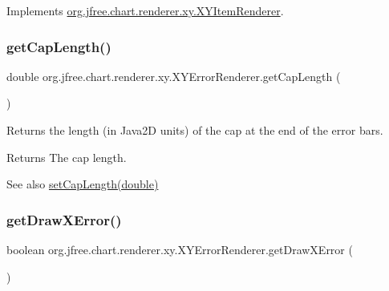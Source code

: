 Implements \mbox{\hyperlink{interfaceorg_1_1jfree_1_1chart_1_1renderer_1_1xy_1_1_x_y_item_renderer_af9ac6f440e99c73d343de7851e89496a}{org.\+jfree.\+chart.\+renderer.\+xy.\+X\+Y\+Item\+Renderer}}.

\mbox{\label{classorg_1_1jfree_1_1chart_1_1renderer_1_1xy_1_1_x_y_error_renderer_ad72439c734df92e2dd89e4fa6dc5f071}} 
\subsubsection{\texorpdfstring{get\+Cap\+Length()}{getCapLength()}}
{\footnotesize\ttfamily double org.\+jfree.\+chart.\+renderer.\+xy.\+X\+Y\+Error\+Renderer.\+get\+Cap\+Length (\begin{DoxyParamCaption}{ }\end{DoxyParamCaption})}

Returns the length (in Java2D units) of the cap at the end of the error bars.

\begin{DoxyReturn}{Returns}
The cap length.
\end{DoxyReturn}
\begin{DoxySeeAlso}{See also}
\mbox{\hyperlink{classorg_1_1jfree_1_1chart_1_1renderer_1_1xy_1_1_x_y_error_renderer_a78522ec7f32d90e558624ff4dab196cb}{set\+Cap\+Length(double)}} 
\end{DoxySeeAlso}
\mbox{\label{classorg_1_1jfree_1_1chart_1_1renderer_1_1xy_1_1_x_y_error_renderer_ab1a5ab1db9b1a1c185c3258a3abf6d84}} 
\subsubsection{\texorpdfstring{get\+Draw\+X\+Error()}{getDrawXError()}}
{\footnotesize\ttfamily boolean org.\+jfree.\+chart.\+renderer.\+xy.\+X\+Y\+Error\+Renderer.\+get\+Draw\+X\+Error (\begin{DoxyParamCaption}{ }\end{DoxyParamCaption})}

